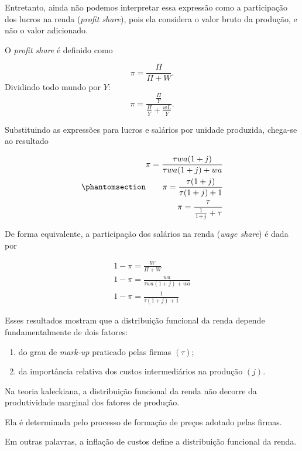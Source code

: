 \documentclass[
  brazilian,
  letterpaper,
  DIV=11,
  numbers=noendperiod]{scrreprt}
\providecommand{\tightlist}{%
  \setlength{\itemsep}{0pt}\setlength{\parskip}{0pt}}
\begin{document}
Entretanto, ainda não podemos interpretar essa expressão como a
participação dos lucros na renda (\emph{profit share}), pois ela
considera o valor bruto da produção, e não o valor adicionado.

O \emph{profit share} é definido como

\[\pi=\frac{\Pi}{\Pi+W}.\] Dividindo todo mundo por \(Y\):
\[\pi=\frac{\frac{\Pi}{Y}}{\frac{\Pi}{Y}+\frac{wL}{Y}}.\]

Substituindo as expressões para lucros e salários por unidade produzida,
chega-se ao resultado

\begin{equation}\protect\phantomsection\label{eq-profit-share}{\begin{aligned}
\pi=\frac{\tau wa (1+j)}{\tau wa(1+j)+wa}\\
\pi=\frac{\tau(1+j)}{\tau(1+j)+1}\\
\pi = \frac{\tau}{\frac{1}{1+j} + \tau}
\end{aligned}}\end{equation}

De forma equivalente, a participação dos salários na renda (\emph{wage
share}) é dada por

\[\begin{aligned}
1-\pi=\frac{W}{\Pi+W}\\
1-\pi = \frac{wa}{\tau wa(1+j) + wa}\\
1-\pi = \frac{1}{\tau(1+j)+1}
\end{aligned}\]

Esses resultados mostram que a distribuição funcional da renda depende
fundamentalmente de dois fatores:

\begin{enumerate}
\def\labelenumi{\arabic{enumi}.}
\tightlist
\item
  do grau de \emph{mark-up} praticado pelas firmas \((\tau)\);
\item
  da importância relativa dos custos intermediários na produção \((j)\).
\end{enumerate}

\begin{tcolorbox}[enhanced jigsaw, arc=.35mm, bottomrule=.15mm, bottomtitle=1mm, breakable, colback=white, colbacktitle=quarto-callout-important-color!10!white, colframe=quarto-callout-important-color-frame, coltitle=black, left=2mm, leftrule=.75mm, opacityback=0, opacitybacktitle=0.6, rightrule=.15mm, title=\textcolor{quarto-callout-important-color}{\faExclamation}\hspace{0.5em}{Resultado fundamental}, titlerule=0mm, toprule=.15mm, toptitle=1mm]

Na teoria kaleckiana, a distribuição funcional da renda não decorre da
produtividade marginal dos fatores de produção.

Ela é determinada pelo processo de formação de preços adotado pelas
firmas.

Em outras palavras, a inflação de custos define a distribuição funcional
da renda.

\end{tcolorbox}
\end{document}
